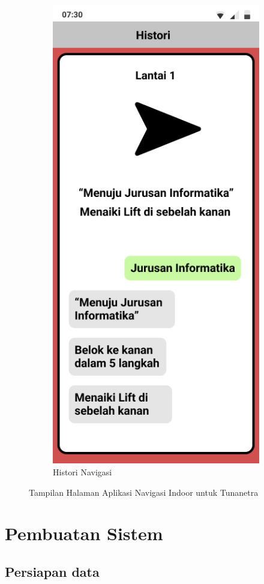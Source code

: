 \begin{enumerate}
\begin{figure} [H]
\begin{subfigure}{.5\textwidth}
  		\includegraphics[width=.5\linewidth]{gambar/bab3/4}  
  		\caption{Histori Navigasi}
	\end{subfigure}
		\vspace{0.5cm}
		\caption{Tampilan Halaman Aplikasi Navigasi Indoor untuk Tunanetra}
	\label{aplikasimappingbagian1}
	\end{figure}

\end{enumerate}


\newpage

\section{Pembuatan Sistem}
\subsection{Persiapan data}

